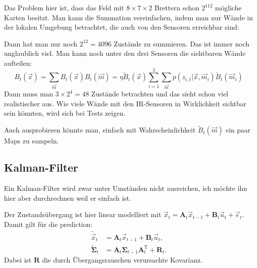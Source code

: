 \documentclass{scrartcl}
\newcommand{\TT}{\mathrm{T}}
\newcommand{\mat}[1]{\mathbf{#1}}
\renewcommand{\|}{\vert}
\begin{document}
Das Problem hier ist, dass das Feld mit $8 \times 7 \times 2$ Brettern schon $2^{112}$ mögliche Karten besitzt.
Man kann die Summation vereinfachen, indem man nur Wände in der lokalen Umgebung betrachtet, die auch von den Sensoren erreichbar sind:


Dann hat man nur noch $2^{12} = 4096$ Zustände zu summieren.
Das ist immer noch unglaublich viel.
Man kann noch unter den drei Sensoren die sichtbaren Wände aufteilen:
\[
    B_t(\vec{x}) = \sum_{\vec{m}} B_t(\vec{x}) B_t(\vec{m}) = 
    \eta \tilde B_t(\vec{x}) \sum_{i=1}^3 \sum_{\vec{m}} p(z_{i,t} \| \vec{x}, \vec{m}_i) \tilde B_t(\vec{m}_i)
\]
Dann muss man $3 \times 2^4 = 48$ Zustände betrachten und das sieht schon viel realistischer aus.
Wie viele Wände mit den IR-Sensoren in Wirklichkeit sichtbar sein könnten, wird sich bei Tests zeigen.

Auch ausprobieren könnte man, einfach mit Wahrscheinlichkeit $\tilde B_t(\vec{m})$ ein paar Maps zu sampeln.

\subsection{Kalman-Filter}
Ein Kalman-Filter wird zwar unter Umständen nicht ausreichen, ich möchte ihn hier aber durchrechnen weil er einfach ist.

Der Zustandsübergang ist hier linear modelliert mit $\vec{x}_t = \mat{A}_t \vec{x}_{t-1} + \mat{B}_t \vec{u}_t + \vec{\epsilon}_t$.
Damit gilt für die prediction:
\begin{align}
    \tilde{\vec{x}}_t &= \mat{A}_t \vec{x}_{t-1} + \mat{B}_t \vec{u}_t,
    \\
    \mat{\tilde \Sigma}_t &= \mat{A}_t \mat{\Sigma}_{t-1} \mat{A}_t^\TT + \mat{R}_t.
\end{align}
Dabei ist $\mat R$ die durch Übergangsrauschen verursachte Kovarianz.
\end{document}
